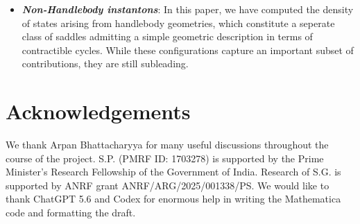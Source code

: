 \documentclass[12 pt]{article}
\begin{document}
\begin{itemize}
This suggests that physical quantities can be expressed in terms of  Siegel modular forms and written as sums over the full $Sp(4,\mathbb{Z})$ modular group. Such a formulation would naturally incorporate both separating and non-separating contributions, avoiding reliance on degeneration limits \textit{Developing computational methods directly on the Siegel upper half-space, without invoking factorization, is therefore an important direction toward uncovering the complete modular structure.} 
\item \textit{\textbf{Non-Handlebody instantons}}: In this paper, we have computed the density of states arising from handlebody geometries, which constitute a seperate class of saddles admitting a simple geometric description in terms of contractible cycles. While these configurations capture an important subset of contributions, they are still subleading.
\end{itemize}

\section*{Acknowledgements}
 We thank Arpan Bhattacharyya for many useful discussions throughout the course of the project. S.P. (PMRF ID: 1703278) is supported by the Prime Minister’s Research Fellowship of the Government of India. Research of S.G. is supported by ANRF grant ANRF/ARG/2025/001338/PS. We would like to thank ChatGPT 5.6 and Codex for enormous help in writing the Mathematica code and formatting the draft.
\appendix
\end{document}
